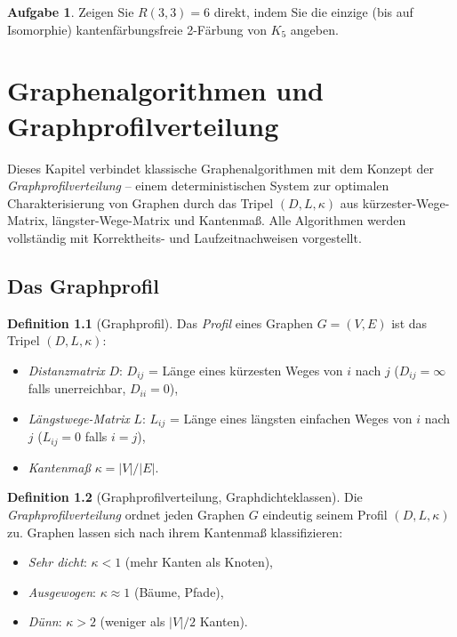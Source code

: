 ﻿\documentclass[a4paper,12pt,openany,oneside]{book}
\theoremstyle{definition}
\newtheorem{definition}{Definition}[chapter]
\newtheorem{aufgabe}{Aufgabe}[chapter]
\theoremstyle{plain}
\theoremstyle{remark}
\begin{document}
\begin{aufgabe}
  Zeigen Sie $R(3,3) = 6$ direkt, indem Sie die einzige (bis auf
  Isomorphie) kantenf\"arbungsfreie 2-F\"arbung von $K_5$ angeben.
\end{aufgabe}
\chapter{Graphenalgorithmen und Graphprofilverteilung}
\label{chap:algorithmen}

Dieses Kapitel verbindet klassische Graphenalgorithmen mit dem Konzept
der \emph{Graphprofilverteilung} -- einem deterministischen System zur
optimalen Charakterisierung von Graphen durch das Tripel $(D,L,\kappa)$
aus k\"urzester-Wege-Matrix, l\"angster-Wege-Matrix und Kantenma\ss{}.
Alle Algorithmen werden vollst\"andig mit Korrektheits- und Laufzeitnachweisen
vorgestellt.

\section{Das Graphprofil}

\begin{definition}[Graphprofil]
  Das \emph{Profil} eines Graphen $G=(V,E)$ ist das Tripel $(D,L,\kappa)$:
  \begin{itemize}
    \item \emph{Distanzmatrix} $D$: $D_{ij}$ = L\"ange eines k\"urzesten
          Weges von $i$ nach $j$ ($D_{ij} = \infty$ falls unerreichbar,
          $D_{ii} = 0$),
    \item \emph{L\"angstwege-Matrix} $L$: $L_{ij}$ = L\"ange eines l\"angsten
          einfachen Weges von $i$ nach $j$ ($L_{ij} = 0$ falls $i = j$),
    \item \emph{Kantenma\ss{}} $\kappa = |V|/|E|$.
  \end{itemize}
\end{definition}

\begin{definition}[Graphprofilverteilung, Graphdichteklassen]
  Die \emph{Graphprofilverteilung} ordnet jeden Graphen $G$ eindeutig
  seinem Profil $(D, L, \kappa)$ zu. Graphen lassen sich nach ihrem
  Kantenma\ss{} klassifizieren:
  \begin{itemize}
    \item \emph{Sehr dicht}: $\kappa < 1$ (mehr Kanten als Knoten),
    \item \emph{Ausgewogen}: $\kappa \approx 1$ (B\"aume, Pfade),
    \item \emph{D\"unn}: $\kappa > 2$ (weniger als $|V|/2$ Kanten).
  \end{itemize}
\end{definition}
\end{document}
